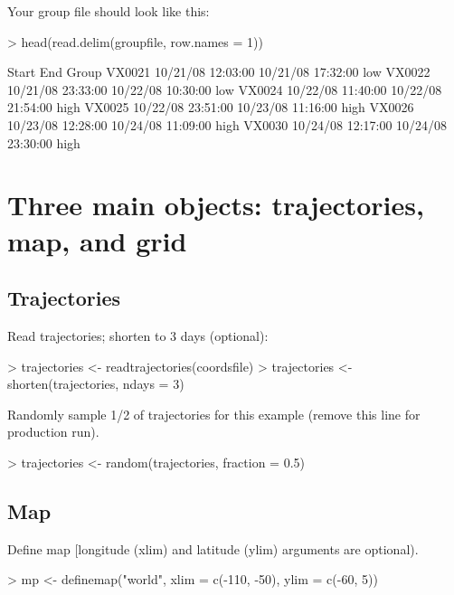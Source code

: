 \documentclass{article}
\renewenvironment{Schunk}{\vspace{\topsep}}{\vspace{\topsep}}
\begin{document}
Your group file should look like this:

\begin{Schunk}
\begin{Sinput}
> head(read.delim(groupfile, row.names = 1))
\end{Sinput}
\begin{Soutput}
                   Start               End Group
VX0021 10/21/08 12:03:00 10/21/08 17:32:00   low
VX0022 10/21/08 23:33:00 10/22/08 10:30:00   low
VX0024 10/22/08 11:40:00 10/22/08 21:54:00  high
VX0025 10/22/08 23:51:00 10/23/08 11:16:00  high
VX0026 10/23/08 12:28:00 10/24/08 11:09:00  high
VX0030 10/24/08 12:17:00 10/24/08 23:30:00  high
\end{Soutput}
\end{Schunk}

\section{Three main objects:  trajectories, map, and grid}

\subsection{Trajectories}

Read trajectories; shorten to 3 days (optional):

\begin{Schunk}
\begin{Sinput}
> trajectories <- readtrajectories(coordsfile)
> trajectories <- shorten(trajectories, ndays = 3)
\end{Sinput}
\end{Schunk}

Randomly sample 1/2 of trajectories for this example (remove this line
for production run).

\begin{Schunk}
\begin{Sinput}
> trajectories <- random(trajectories, fraction = 0.5)
\end{Sinput}
\end{Schunk}

\subsection{Map}

Define map [longitude (xlim) and latitude (ylim) arguments are
optional).

\begin{Schunk}
\begin{Sinput}
> mp <- definemap("world", xlim = c(-110, -50), ylim = c(-60, 5))
\end{Sinput}
\end{Schunk}
\end{document}
